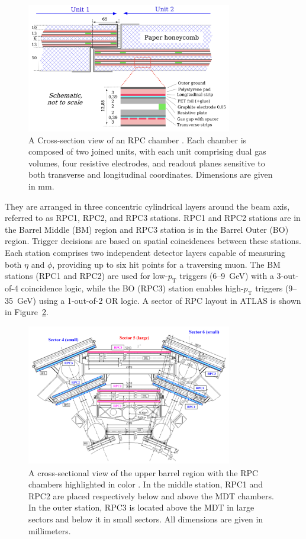 \begin{figure}[htbp]
  \centering
  \includegraphics[width=0.8\textwidth]{figs/chapter2/RPC_cross_section.png}
  \caption{A Cross-section view of an RPC chamber \cite{ATLASDetector2008}. Each chamber is composed of two joined units, with each unit comprising dual gas volumes, four resistive electrodes, and readout planes sensitive to both transverse and longitudinal coordinates. Dimensions are given in mm.}
  \label{fig:RPC_cross_section}
\end{figure}

They are arranged in three concentric cylindrical layers around the beam axis, referred to as RPC1, RPC2, and RPC3 stations. RPC1 and RPC2 stations are in the Barrel Middle (BM) region and RPC3 station is in the Barrel Outer (BO) region. Trigger decisions are based on spatial coincidences between these stations. Each station comprises two independent detector layers capable of measuring both $\eta$ and $\phi$, providing up to six hit points for a traversing muon. The BM stations (RPC1 and RPC2) are used for low-$p_\mathrm{T}$ triggers (6--9~GeV) with a 3-out-of-4 coincidence logic, while the BO (RPC3) station enables high-$p_\mathrm{T}$ triggers (9--35~GeV) using a 1-out-of-2 OR logic. A sector of RPC layout in ATLAS is shown in Figure~\ref{fig:RPC_layout}.

\begin{figure}[htbp]
  \centering
  \includegraphics[width=0.8\textwidth]{figs/chapter2/RPC_layout.png}
  \caption{A cross-sectional view of the upper barrel region with the RPC chambers highlighted in color \cite{ATLASDetector2008}. In the middle station, RPC1 and RPC2 are placed respectively below and above the MDT chambers. In the outer station, RPC3 is located above the MDT in large sectors and below it in small sectors. All dimensions are given in millimeters.}
  \label{fig:RPC_layout}
\end{figure}

